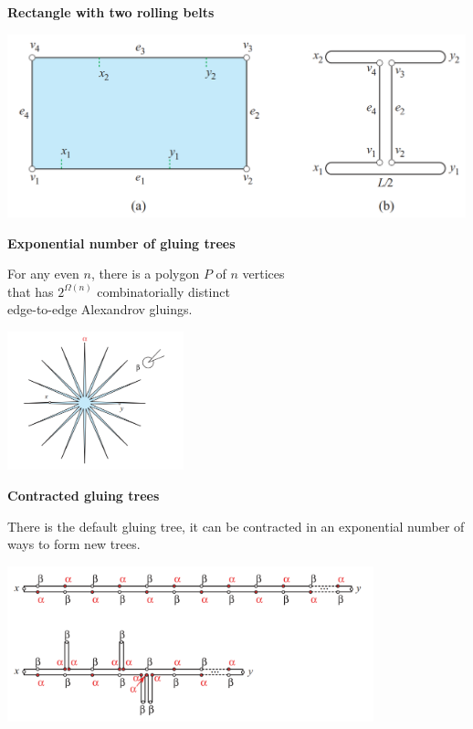 \documentclass[11pt,a4paper]{extarticle}
\begin{document}
{\large \bf Rectangle with two rolling belts}

\begin{center}
	\includegraphics[height=5.3cm]{minilec/rectrb}
\end{center}

{\large \bf Exponential number of gluing trees} \vspace{-2mm}

For any even \(n\), there is a polygon \(P\) of \(n\) vertices \\
that has \(2^{Ω(n)}\) combinatorially distinct \\
edge-to-edge Alexandrov gluings. \vspace{-2mm}

\begin{center}
	\includegraphics[width=5.1cm]{minilec/stargt}
\end{center}

{\large \bf Contracted gluing trees}

There is the default gluing tree, it can be contracted in an exponential number of ways to form new trees.

\begin{center}
	\includegraphics[height=4.5cm]{minilec/stargtcontract}
\end{center}
\end{document}
